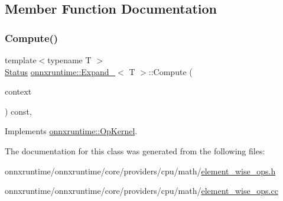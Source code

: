 \subsection{Member Function Documentation}
\mbox{\label{classonnxruntime_1_1Expand__8_ae3d9756b904c45ab9f6d5e9892027f0c}} 
\subsubsection{\texorpdfstring{Compute()}{Compute()}}
{\footnotesize\ttfamily template$<$typename T $>$ \\
\mbox{\hyperlink{classonnxruntime_1_1common_1_1Status}{Status}} \mbox{\hyperlink{classonnxruntime_1_1Expand__8}{onnxruntime\+::\+Expand\+\_}}$<$ T $>$\+::Compute (\begin{DoxyParamCaption}\item[{\mbox{\hyperlink{classonnxruntime_1_1OpKernelContext}{Op\+Kernel\+Context}} $\ast$}]{context }\end{DoxyParamCaption}) const\hspace{0.3cm}{\ttfamily [override]}, {\ttfamily [virtual]}}



Implements \mbox{\hyperlink{classonnxruntime_1_1OpKernel_a9eca8656a78b1b3ab9d3351a12798650}{onnxruntime\+::\+Op\+Kernel}}.



The documentation for this class was generated from the following files\+:\begin{DoxyCompactItemize}
\item 
onnxruntime/onnxruntime/core/providers/cpu/math/\mbox{\hyperlink{element__wise__ops_8h}{element\+\_\+wise\+\_\+ops.\+h}}\item 
onnxruntime/onnxruntime/core/providers/cpu/math/\mbox{\hyperlink{element__wise__ops_8cc}{element\+\_\+wise\+\_\+ops.\+cc}}\end{DoxyCompactItemize}
